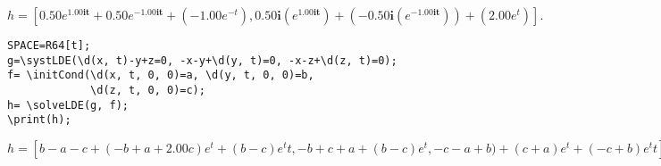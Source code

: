 {$h = [0. 50 e^{1. 00\mathbf{it}}+0. 50 e^{-1. 00\mathbf{it}}+(-1. 00 e^{-t}), 0. 50\mathbf{i} (e^{1. 00\mathbf{it}})+(-0. 50\mathbf{i} (e^{-1. 00\mathbf{it}}))+(2. 00 e^{t})]. $}

\begin{verbatim}
SPACE=R64[t];
g=\systLDE(\d(x, t)-y+z=0, -x-y+\d(y, t)=0, -x-z+\d(z, t)=0);
f= \initCond(\d(x, t, 0, 0)=a, \d(y, t, 0, 0)=b, 
             \d(z, t, 0, 0)=c);
h= \solveLDE(g, f);  
\print(h);
\end{verbatim}

{$h = [b-a-c+(-b+a+2.00c)e^{t}+(b-c)e^{t}t,
-b+c+a+(b-c)e^{t},
-c-a+b)+(c+a)e^{t}+(-c+b)e^{t}t];$}

